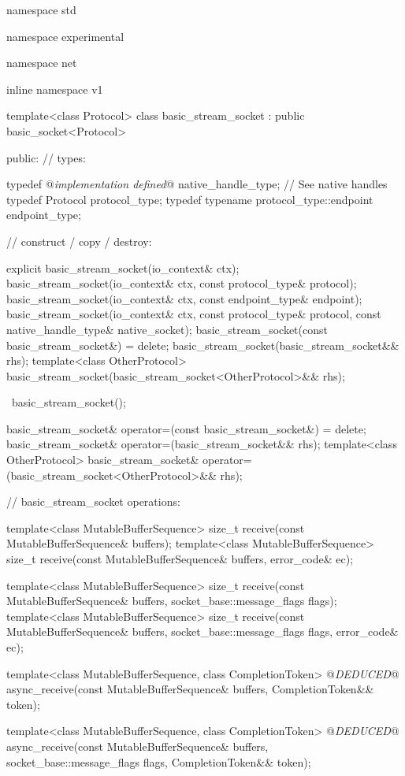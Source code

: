 \begin{codeblock}
namespace std {
namespace experimental {
namespace net {
inline namespace v1 {

  template<class Protocol>
  class basic_stream_socket : public basic_socket<Protocol>
  {
  public:
    // types:

    typedef @\textit{implementation defined}@ native_handle_type; // See native handles
    typedef Protocol protocol_type;
    typedef typename protocol_type::endpoint endpoint_type;

    // construct / copy / destroy:

    explicit basic_stream_socket(io_context& ctx);
    basic_stream_socket(io_context& ctx, const protocol_type& protocol);
    basic_stream_socket(io_context& ctx, const endpoint_type& endpoint);
    basic_stream_socket(io_context& ctx, const protocol_type& protocol,
                        const native_handle_type& native_socket);
    basic_stream_socket(const basic_stream_socket&) = delete;
    basic_stream_socket(basic_stream_socket&& rhs);
    template<class OtherProtocol>
      basic_stream_socket(basic_stream_socket<OtherProtocol>&& rhs);

    ~basic_stream_socket();

    basic_stream_socket& operator=(const basic_stream_socket&) = delete;
    basic_stream_socket& operator=(basic_stream_socket&& rhs);
    template<class OtherProtocol>
      basic_stream_socket& operator=(basic_stream_socket<OtherProtocol>&& rhs);

    // basic_stream_socket operations:

    template<class MutableBufferSequence>
      size_t receive(const MutableBufferSequence& buffers);
    template<class MutableBufferSequence>
      size_t receive(const MutableBufferSequence& buffers,
                     error_code& ec);

    template<class MutableBufferSequence>
      size_t receive(const MutableBufferSequence& buffers,
                     socket_base::message_flags flags);
    template<class MutableBufferSequence>
      size_t receive(const MutableBufferSequence& buffers,
                     socket_base::message_flags flags, error_code& ec);

    template<class MutableBufferSequence, class CompletionToken>
      @\textit{DEDUCED}@ async_receive(const MutableBufferSequence& buffers,
                            CompletionToken&& token);

    template<class MutableBufferSequence, class CompletionToken>
      @\textit{DEDUCED}@ async_receive(const MutableBufferSequence& buffers,
                            socket_base::message_flags flags,
                            CompletionToken&& token);

}}}}}
\end{codeblock}
